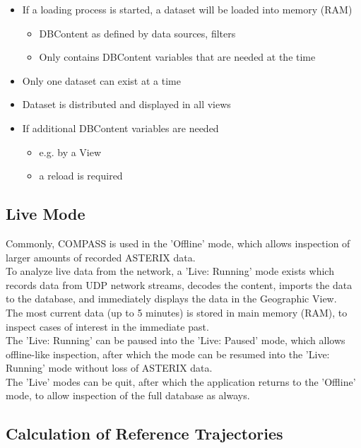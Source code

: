 \begin{itemize}
\item If a loading process is started, a dataset will be loaded into memory (RAM)
\begin{itemize}
\item DBContent as defined by data sources, filters
\item Only contains DBContent variables that are needed at the time
\end{itemize}
\item Only one dataset can exist at a time
\item Dataset is distributed and displayed in all views
\item If additional DBContent variables are needed
\begin{itemize}
\item e.g. by a View
\item a reload is required
\end{itemize}
\end{itemize}

\subsection*{Live Mode}
Commonly, COMPASS is used in the 'Offline' mode, which allows inspection of larger amounts of recorded ASTERIX data. \\

To analyze live data from the network, a 'Live: Running' mode exists which records data from UDP network streams, decodes the content, imports the data to the database, and immediately displays the data in the Geographic View. \\

The most current data (up to 5 minutes) is stored in main memory (RAM), to inspect cases of interest in the immediate past. \\

The 'Live: Running' can be paused into the 'Live: Paused' mode, which allows offline-like inspection, after which the mode can be resumed into the 'Live: Running' mode without loss of ASTERIX data. \\

The 'Live' modes can be quit, after which the application returns to the 'Offline' mode, to allow inspection of the full database as always.

\subsection*{Calculation of Reference Trajectories}

